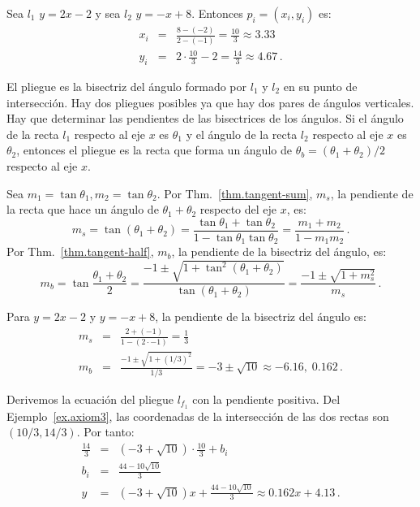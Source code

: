 \begin{example}\label{ex.axiom3}
Sea $l_1$ $y=2x-2$ y sea $l_2$ $y=-x+8$. Entonces $p_i=(x_i,y_i)$ es:
\begin{eqnarray*}
x_i&=&\frac{8-(-2)}{2-(-1)}=\frac{10}{3}\approx 3.33\\
y_i &=& 2\cdot\frac{10}{3}-2=\frac{14}{3}\approx 4.67\,.
\end{eqnarray*}
\end{example}

El pliegue es la bisectriz del ángulo formado por $l_1$ y $l_2$ en su punto de intersección. Hay dos pliegues posibles ya que hay dos pares de ángulos verticales. Hay que determinar las pendientes de las bisectrices de los ángulos. Si el ángulo de la recta $l_1$ respecto al eje $x$ es $\theta_1$ y el ángulo de la recta $l_2$ respecto al eje $x$ es $\theta_2$, entonces el pliegue es la recta que forma un ángulo de $\theta_b=(\theta_1+\theta_2)/2$ respecto al eje $x$.

Sea $m_1=\tan \theta_1, m_2=\tan \theta_2$. Por Thm.~\ref{thm.tangent-sum}, $m_s$, la pendiente de la recta que hace un ángulo de $\theta_1+\theta_2$ respecto del eje $x$, es:
\[
m_s=\tan(\theta_1+\theta_2)= \frac{\tan\theta_1+\tan\theta_2}{1-\tan\theta_1\tan\theta_2}=\frac{m_1+m_2}{1-m_1m_2}\,.
\]
Por Thm.~\ref{thm.tangent-half}, $m_b$, la pendiente de la bisectriz del ángulo, es:
\[
m_b= \tan\frac{\theta_1+\theta_2}{2}=\frac{-1\pm\sqrt{1+\tan^2(\theta_1+\theta_2)}}{\tan (\theta_1+\theta_2)}=\frac{-1\pm\sqrt{1+m_s^2}}{m_s}\,.
\]
\begin{example}
Para $y=2x-2$ y $y=-x+8$, la pendiente de la bisectriz del ángulo es:
\begin{eqnarray*}
m_s&=&\frac{2+(-1)}{1-(2 \cdot -1)}=\frac{1}{3}\\
m_b&=&\frac{-1\pm\sqrt{1+(1/3)^2}}{1/3}=-3\pm \sqrt{10}\approx -6.16,\; 0.162\,.
\end{eqnarray*}
\end{example}

Derivemos la ecuación del pliegue $l_{f_1}$ con la pendiente positiva. Del Ejemplo~\ref{ex.axiom3}, las coordenadas de la intersección de las dos rectas son $(10/3, 14/3)$. Por tanto:
\begin{eqnarray*}
\frac{14}{3} &=& (-3+\sqrt{10}) \cdot \frac{10}{3} + b_i\\ b_i&=&\frac{44-10\sqrt{10}}{3}\\
y&=& (-3+\sqrt{10})x + \frac{44-10\sqrt{10}}{3}\approx 0.162x+4.13\,.
\end{eqnarray*}


